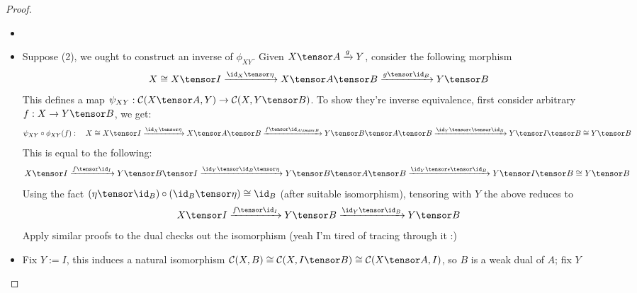 \documentclass{article}
\begin{document}
\begin{proof}

    \hfil

    \begin{itemize}
        \item[(1)$\implies$ (2):]
        
        \hfil

        \item[(2) $\implies$ (3):] Suppose (2), we ought to construct an inverse of $\phi_{XY}$. Given $X\tensor A\xrightarrow{g}Y$, consider the following morphism
        \[X\cong X\tensor I \xrightarrow{\id_X\tensor \eta}X\tensor A\tensor B \xrightarrow{g\tensor \id_B}Y\tensor B\]
        This defines a map $\psi_{XY}:\mathcal{C}(X\tensor A,Y)\rightarrow \mathcal{C}(X,Y\tensor B)$. To show they're inverse equivalence, first consider arbitrary $f:X\rightarrow Y\tensor B$, we get:
        \[\psi_{XY}\circ \phi_{XY}(f):\quad X\cong X\tensor I \xrightarrow{\id_X\tensor \eta}X\tensor A\tensor B\xrightarrow{f\tensor \id_{A\tensor B}}Y\tensor B\tensor A\tensor B\xrightarrow{\id_Y\tensor \epsilon\tensor \id_B}Y\tensor I\tensor B\cong Y\tensor B\]
        This is equal to the following:
        \[X\tensor I\xrightarrow{f\tensor \id_I}Y\tensor B\tensor I\xrightarrow{\id_{Y}\tensor \id_B\tensor \eta}Y\tensor B\tensor A\tensor B\xrightarrow{\id_Y\tensor \epsilon\tensor \id_B}Y\tensor I\tensor B\cong Y\tensor B\]
        Using the fact $(\eta\tensor \id_B)\circ(\id_B\tensor \eta) \cong \id_B$ (after suitable isomorphism), tensoring with $Y$ the above reduces to 
        \[X\tensor I\xrightarrow{f\tensor \id_I}Y\tensor B\xrightarrow{\id_Y\tensor \id_B}Y\tensor B \]
        Apply similar proofs to the dual checks out the isomorphism (yeah I'm tired of tracing through it :)

        \hfil

        \item[(3) $\implies$ (1):] Fix $Y:=I$, this induces a natural isomorphism $\mathcal{C}(X,B)\cong \mathcal{C}(X,I\tensor B)\cong \mathcal{C}(X\tensor A,I)$, so $B$ is a weak dual of $A$; fix $Y$
    \end{itemize}
\end{proof}


\end{document}
